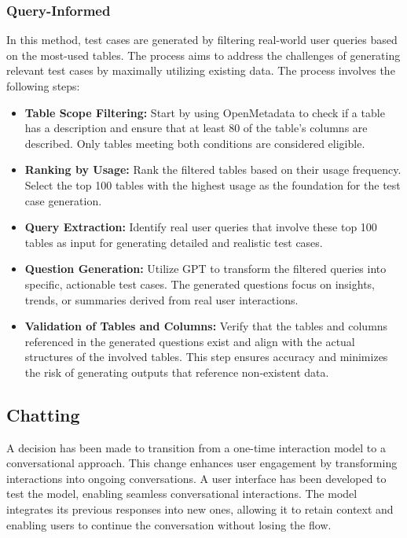         \subsubsection{Query-Informed}
        In this method, test cases are generated by filtering real-world user queries based on the most-used tables. The process aims to address the challenges of generating relevant test cases by maximally utilizing existing data. The process involves the following steps:
        \begin{itemize}
          \item \textbf{Table Scope Filtering:} Start by using OpenMetadata to check if a table has a description and ensure that at least 80\text{\%} of the table's columns are described. Only tables meeting both conditions are considered eligible.
          \item \textbf{Ranking by Usage:} Rank the filtered tables based on their usage frequency. Select the top 100 tables with the highest usage as the foundation for the test case generation.
          \item \textbf{Query Extraction:} Identify real user queries that involve these top 100 tables as input for generating detailed and realistic test cases.
          \item \textbf{Question Generation:} Utilize GPT to transform the filtered queries into specific, actionable test cases. The generated questions focus on insights, trends, or summaries derived from real user interactions.
          \item \textbf{Validation of Tables and Columns:} Verify that the tables and columns referenced in the generated questions exist and align with the actual structures of the involved tables. This step ensures accuracy and minimizes the risk of generating outputs that reference non-existent data.
        \end{itemize}
    \subsection{Chatting}
    A decision has been made to transition from a one-time interaction model to a conversational approach. This change enhances user engagement by transforming interactions into ongoing conversations. A user interface has been developed to test the model, enabling seamless conversational interactions. The model integrates its previous responses into new ones, allowing it to retain context and enabling users to continue the conversation without losing the flow.

